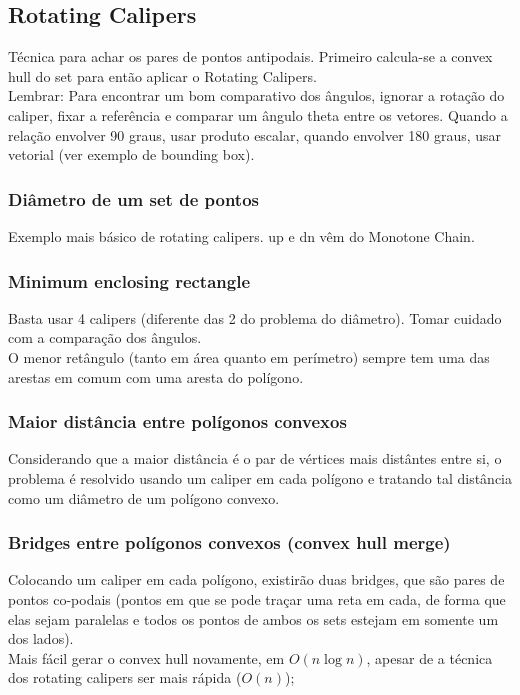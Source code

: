 
\subsection{Rotating Calipers}

T\'{e}cnica para achar os pares de pontos antipodais. Primeiro calcula-se a convex hull do set para ent\~{a}o aplicar o Rotating Calipers.
\\ Lembrar: Para encontrar um bom comparativo dos \^{a}ngulos, ignorar a rota\c{c}\~{a}o do caliper, fixar a refer\^{e}ncia e comparar um \^{a}ngulo theta entre os vetores. Quando a rela\c{c}\~{a}o envolver 90 graus, usar produto escalar, quando envolver 180 graus, usar vetorial (ver exemplo de bounding box).

\subsubsection{Di\^{a}metro de um set de pontos}
Exemplo mais b\'{a}sico de rotating calipers. up e dn v\^{e}m do Monotone Chain.
\divisor

\subsubsection{Minimum enclosing rectangle}
Basta usar 4 calipers (diferente das 2 do problema do di\^{a}metro). Tomar cuidado com a compara\c{c}\~{a}o dos \^{a}ngulos.
\\ O menor ret\^{a}ngulo (tanto em \'{a}rea quanto em per\'{i}metro) sempre tem uma das arestas em comum com uma aresta do pol\'{i}gono.
\divisor

\subsubsection{Maior dist\^{a}ncia entre pol\'{i}gonos convexos}
Considerando que a maior dist\^{a}ncia \'{e} o par de v\'{e}rtices mais dist\^{a}ntes entre si, o problema \'{e}  resolvido usando um caliper em cada pol\'{i}gono e tratando tal dist\^{a}ncia como um di\^{a}metro de um pol\'{i}gono convexo.
\divisor

\subsubsection{Bridges entre pol\'{i}gonos convexos (convex hull merge)}
Colocando um caliper em cada pol\'{i}gono, existir\~{a}o duas bridges, que s\~{a}o pares de pontos co-podais (pontos em que se pode tra\c{c}ar uma reta em cada, de forma que elas sejam paralelas e todos os pontos de ambos os sets estejam em somente um dos lados).
\\ Mais f\'{a}cil gerar o convex hull novamente, em $O(n \log{n})$, apesar de a t\'{e}cnica dos rotating calipers ser mais r\'{a}pida ($O(n)$);
\divisor

